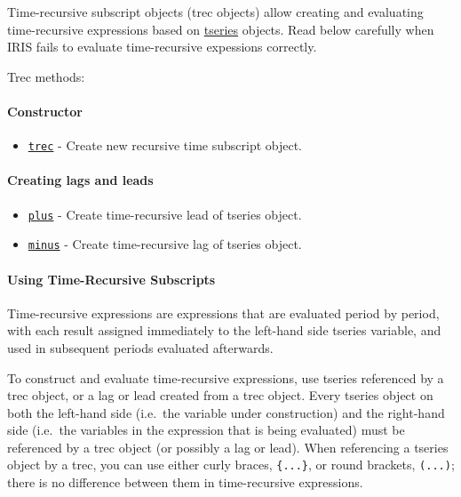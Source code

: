 

	Time-recursive subscript objects (trec objects) allow creating and
evaluating time-recursive expressions based on
\href{tseries/Contents}{tseries} objects. Read below carefully when IRIS
fails to evaluate time-recursive expessions correctly.

Trec methods:

\paragraph{Constructor}

\begin{itemize}
\itemsep1pt\parskip0pt
\item
  \href{trec/trec}{\texttt{trec}} - Create new recursive time subscript
  object.
\end{itemize}

\paragraph{Creating lags and leads}

\begin{itemize}
\itemsep1pt\parskip0pt
\item
  \href{trec/plus}{\texttt{plus}} - Create time-recursive lead of
  tseries object.
\item
  \href{trec/minus}{\texttt{minus}} - Create time-recursive lag of
  tseries object.
\end{itemize}

\paragraph{Using Time-Recursive
Subscripts}

Time-recursive expressions are expressions that are evaluated period by
period, with each result assigned immediately to the left-hand side
tseries variable, and used in subsequent periods evaluated afterwards.

To construct and evaluate time-recursive expressions, use tseries
referenced by a trec object, or a lag or lead created from a trec
object. Every tseries object on both the left-hand side (i.e.~the
variable under construction) and the right-hand side (i.e.~the variables
in the expression that is being evaluated) must be referenced by a trec
object (or possibly a lag or lead). When referencing a tseries object by
a trec, you can use either curly braces, \texttt{\{...\}}, or round
brackets, \texttt{(...)}; there is no difference between them in
time-recursive expressions.

